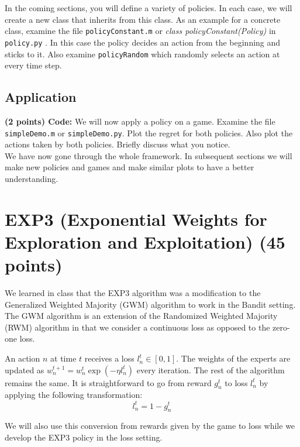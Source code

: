 \documentclass{article}
\begin{document}
In the coming sections, you will define a variety of policies. In each case, we will create a new class that inherits from this class.
As an example for a concrete class, examine the file \texttt{policyConstant.m} or \textit{class policyConstant(Policy)} in \texttt{policy.py} . In this case the policy decides an action from the beginning and sticks to it. Also examine \texttt{policyRandom} which randomly selects an action at every time step.

\subsection{Application}

\noindent\textbf{(2 points) Code:} We will now apply a policy on a game. Examine the file \texttt{simpleDemo.m} or \texttt{simpleDemo.py}.
Plot the regret for both policies. Also plot the actions taken by both policies. Briefly discuss what you notice.\\

\noindent We have now gone through the whole framework. In subsequent sections we will make new policies and games and make similar plots to have a better understanding.


\section{EXP3 (Exponential Weights for Exploration and Exploitation) (45 points)}

We learned in class that the EXP3 algorithm was a modification to the Generalized Weighted Majority (GWM) algorithm to work in the Bandit setting. The GWM algorithm is an extension of the Randomized Weighted Majority (RWM) algorithm in that we consider a continuous loss as opposed to the zero-one loss. 

An action $n$ at time $t$ receives a loss $l^t_n \in [0, 1]$. The weights of the experts are updated as $w^{t+1}_n = w^t_n \exp{(-\eta l^t_n)}$ every iteration. The rest of the algorithm remains the same.  It is straightforward to go from reward $g^t_n$ to loss $l^t_n$ by applying the following transformation:
\begin{equation}
l^t_n = 1 - g^t_n
\end{equation}

We will also use this conversion from rewards given by the game to loss while we develop the EXP3 policy in the loss setting.
\end{document}
